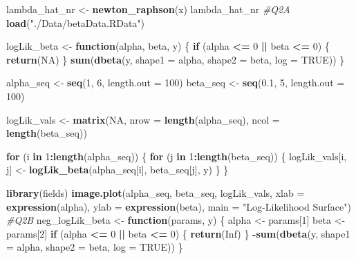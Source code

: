 \documentclass[
]{article}
\newenvironment{Shaded}{\begin{snugshade}}{\end{snugshade}}
\newcommand{\AttributeTok}[1]{\textcolor[rgb]{0.13,0.29,0.53}{#1}}
\newcommand{\CommentTok}[1]{\textcolor[rgb]{0.56,0.35,0.01}{\textit{#1}}}
\newcommand{\ConstantTok}[1]{\textcolor[rgb]{0.56,0.35,0.01}{#1}}
\newcommand{\ControlFlowTok}[1]{\textcolor[rgb]{0.13,0.29,0.53}{\textbf{#1}}}
\newcommand{\DecValTok}[1]{\textcolor[rgb]{0.00,0.00,0.81}{#1}}
\newcommand{\FloatTok}[1]{\textcolor[rgb]{0.00,0.00,0.81}{#1}}
\newcommand{\FunctionTok}[1]{\textcolor[rgb]{0.13,0.29,0.53}{\textbf{#1}}}
\newcommand{\NormalTok}[1]{#1}
\newcommand{\OtherTok}[1]{\textcolor[rgb]{0.56,0.35,0.01}{#1}}
\newcommand{\SpecialCharTok}[1]{\textcolor[rgb]{0.81,0.36,0.00}{\textbf{#1}}}
\newcommand{\StringTok}[1]{\textcolor[rgb]{0.31,0.60,0.02}{#1}}
\begin{document}
\begin{Shaded}
\begin{Highlighting}[]
\NormalTok{lambda\_hat\_nr }\OtherTok{\textless{}{-}} \FunctionTok{newton\_raphson}\NormalTok{(x)}
\NormalTok{lambda\_hat\_nr}
\CommentTok{\#Q2A}
\FunctionTok{load}\NormalTok{(}\StringTok{"./Data/betaData.RData"}\NormalTok{)}

\NormalTok{logLik\_beta }\OtherTok{\textless{}{-}} \ControlFlowTok{function}\NormalTok{(alpha, beta, y) \{}
  \ControlFlowTok{if}\NormalTok{ (alpha }\SpecialCharTok{\textless{}=} \DecValTok{0} \SpecialCharTok{||}\NormalTok{ beta }\SpecialCharTok{\textless{}=} \DecValTok{0}\NormalTok{) \{}
    \FunctionTok{return}\NormalTok{(}\ConstantTok{NA}\NormalTok{)}
\NormalTok{  \}}
  \FunctionTok{sum}\NormalTok{(}\FunctionTok{dbeta}\NormalTok{(y, }\AttributeTok{shape1 =}\NormalTok{ alpha, }\AttributeTok{shape2 =}\NormalTok{ beta, }\AttributeTok{log =} \ConstantTok{TRUE}\NormalTok{))}
\NormalTok{\}}

\NormalTok{alpha\_seq }\OtherTok{\textless{}{-}} \FunctionTok{seq}\NormalTok{(}\DecValTok{1}\NormalTok{, }\DecValTok{6}\NormalTok{, }\AttributeTok{length.out =} \DecValTok{100}\NormalTok{)}
\NormalTok{beta\_seq }\OtherTok{\textless{}{-}} \FunctionTok{seq}\NormalTok{(}\FloatTok{0.1}\NormalTok{, }\DecValTok{5}\NormalTok{, }\AttributeTok{length.out =} \DecValTok{100}\NormalTok{)}

\NormalTok{logLik\_vals }\OtherTok{\textless{}{-}} \FunctionTok{matrix}\NormalTok{(}\ConstantTok{NA}\NormalTok{, }\AttributeTok{nrow =} \FunctionTok{length}\NormalTok{(alpha\_seq), }\AttributeTok{ncol =} \FunctionTok{length}\NormalTok{(beta\_seq))}

\ControlFlowTok{for}\NormalTok{ (i }\ControlFlowTok{in} \DecValTok{1}\SpecialCharTok{:}\FunctionTok{length}\NormalTok{(alpha\_seq)) \{}
  \ControlFlowTok{for}\NormalTok{ (j }\ControlFlowTok{in} \DecValTok{1}\SpecialCharTok{:}\FunctionTok{length}\NormalTok{(beta\_seq)) \{}
\NormalTok{    logLik\_vals[i, j] }\OtherTok{\textless{}{-}} \FunctionTok{logLik\_beta}\NormalTok{(alpha\_seq[i], beta\_seq[j], y)}
\NormalTok{  \}}
\NormalTok{\}}

\FunctionTok{library}\NormalTok{(fields)}
\FunctionTok{image.plot}\NormalTok{(alpha\_seq, beta\_seq, logLik\_vals, }\AttributeTok{xlab =} \FunctionTok{expression}\NormalTok{(alpha), }\AttributeTok{ylab =} \FunctionTok{expression}\NormalTok{(beta), }\AttributeTok{main =} \StringTok{"Log{-}Likelihood Surface"}\NormalTok{)}
\CommentTok{\#Q2B}
\NormalTok{neg\_logLik\_beta }\OtherTok{\textless{}{-}} \ControlFlowTok{function}\NormalTok{(params, y) \{}
\NormalTok{  alpha }\OtherTok{\textless{}{-}}\NormalTok{ params[}\DecValTok{1}\NormalTok{]}
\NormalTok{  beta }\OtherTok{\textless{}{-}}\NormalTok{ params[}\DecValTok{2}\NormalTok{]}
  \ControlFlowTok{if}\NormalTok{ (alpha }\SpecialCharTok{\textless{}=} \DecValTok{0} \SpecialCharTok{||}\NormalTok{ beta }\SpecialCharTok{\textless{}=} \DecValTok{0}\NormalTok{) \{}
    \FunctionTok{return}\NormalTok{(}\ConstantTok{Inf}\NormalTok{)}
\NormalTok{  \}}
  \SpecialCharTok{{-}}\FunctionTok{sum}\NormalTok{(}\FunctionTok{dbeta}\NormalTok{(y, }\AttributeTok{shape1 =}\NormalTok{ alpha, }\AttributeTok{shape2 =}\NormalTok{ beta, }\AttributeTok{log =} \ConstantTok{TRUE}\NormalTok{))}
\NormalTok{\}}


\end{Highlighting}
\end{Shaded}
\end{document}
